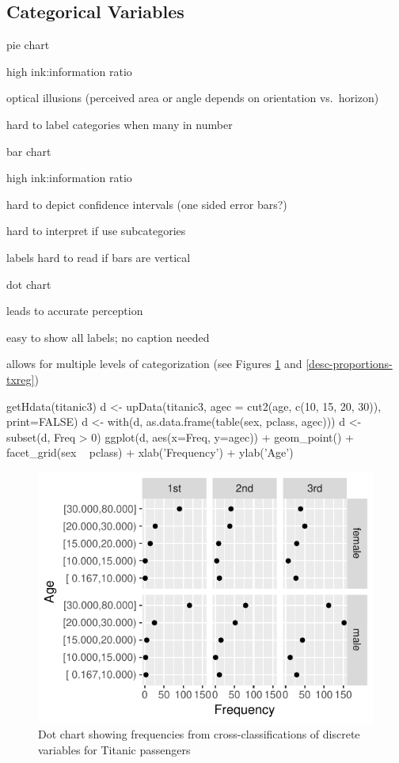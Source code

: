 \subsection{Categorical Variables}
\bi
\item pie chart
 \bi
 \item high ink:information ratio
 \item optical illusions (perceived area or angle depends on
   orientation vs.\ horizon)
 \item hard to label categories when many in number
 \ei
\item bar chart
 \bi
 \item high ink:information ratio
 \item hard to depict confidence intervals (one sided error bars?)
 \item hard to interpret if use subcategories
 \item labels hard to read if bars are vertical
 \ei
\item dot chart
 \bi
 \item leads to accurate perception
 \item easy to show all labels; no caption needed
 \item allows for multiple levels of categorization (see Figures \ref{fig:descript-counts-dotchart} and \ref{desc-proportions-txreg})
 
\begin{Schunk}
\begin{Sinput}
getHdata(titanic3)
d <- upData(titanic3,
            agec     = cut2(age, c(10, 15, 20, 30)), print=FALSE)
d <- with(d, as.data.frame(table(sex, pclass, agec)))
d <- subset(d, Freq > 0)
ggplot(d, aes(x=Freq, y=agec)) + geom_point() +
  facet_grid(sex ~ pclass) +
  xlab('Frequency') + ylab('Age')
\end{Sinput}
\begin{figure}[htbp]

\centerline{\includegraphics[width=\maxwidth]{descript-counts-dotchart-1} }

\caption[Frequency dot chart]{Dot chart showing frequencies from cross-classifications of discrete variables for Titanic passengers}\label{fig:descript-counts-dotchart}
\end{figure}
\end{Schunk}

